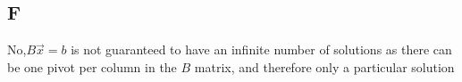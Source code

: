 \documentclass{report}
\begin{document}
\subsection*{F}

No,\(B \vec{x} = b\) is not guaranteed to have an infinite number of solutions as there can be one pivot per column in the \(B\) matrix, and therefore only a particular solution 
\end{document}
